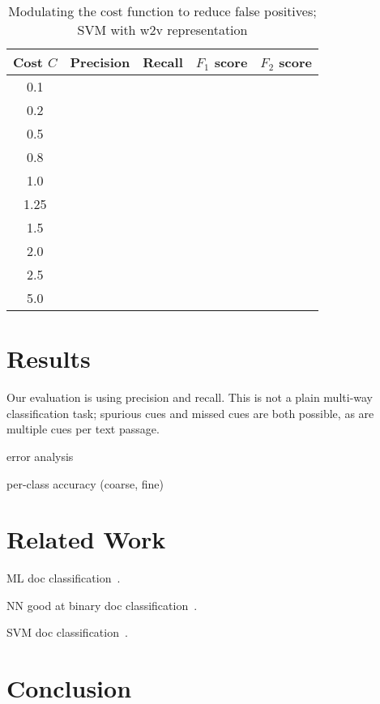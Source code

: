 \documentclass[11pt]{article}
\begin{document}
\begin{table*}
\centering
\footnotesize
\begin{tabular}{c|cccc}
\hline
{\bf Cost $C$} & {\bf Precision} & {\bf Recall} & {\bf $F_1$ score} & {\bf $F_2$ score} \\
\hline
0.1 &&&& \\
0.2 &&&& \\
0.5 &&&& \\
0.8 &&&& \\
1.0 &&&& \\
1.25 &&&& \\
1.5 &&&& \\
2.0 &&&& \\
2.5 &&&& \\
5.0 &&&& \\
\hline
\end{tabular}
\caption{Modulating the cost function to reduce false positives; SVM with w2v representation}
\label{ref:results-cost}
\end{table*}


\section{Results}

Our evaluation is using precision and recall.
This is not a plain multi-way classification task; spurious cues and missed cues are both possible, as are multiple cues per text passage.

error analysis

per-class accuracy (coarse, fine)


\section{Related Work}

ML doc classification~\cite{sebastiani2002machine}.

NN good at binary doc classification~\cite{derczynski2006machine}.

SVM doc classification~\cite{isa2008text}.


\section{Conclusion}


\iffalse
\section*{Acknowledgments}
This project has received funding from the European Union’s Seventh Framework Programme for research, technological development and demonstration under grant agreement No. 611233, \textsc{Pheme}.
ah, was anything funding this? could anything be associated with this?? ahhh, erm
\fi



\end{document}
